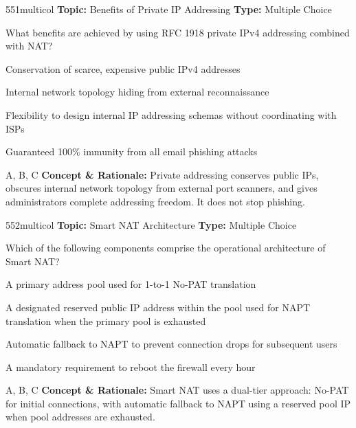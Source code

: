 \begin{qcard}{551}{multicol}
\textcolor{darkslate!75}{\small\textbf{Topic:} Benefits of Private IP Addressing \hfill \textbf{Type:} Multiple Choice}\vspace{0.4em}\par
What benefits are achieved by using RFC 1918 private IPv4 addressing combined with NAT?
\begin{qoptions}
\item Conservation of scarce, expensive public IPv4 addresses
\item Internal network topology hiding from external reconnaissance
\item Flexibility to design internal IP addressing schemas without coordinating with ISPs
\item Guaranteed 100\% immunity from all email phishing attacks
\end{qoptions}
\end{qcard}
\nopagebreak
\begin{explainbox}{A, B, C}
\textbf{Concept \& Rationale:} Private addressing conserves public IPs, obscures internal network topology from external port scanners, and gives administrators complete addressing freedom. It does not stop phishing.
\end{explainbox}

\begin{qcard}{552}{multicol}
\textcolor{darkslate!75}{\small\textbf{Topic:} Smart NAT Architecture \hfill \textbf{Type:} Multiple Choice}\vspace{0.4em}\par
Which of the following components comprise the operational architecture of Smart NAT?
\begin{qoptions}
\item A primary address pool used for 1-to-1 No-PAT translation
\item A designated reserved public IP address within the pool used for NAPT translation when the primary pool is exhausted
\item Automatic fallback to NAPT to prevent connection drops for subsequent users
\item A mandatory requirement to reboot the firewall every hour
\end{qoptions}
\end{qcard}
\nopagebreak
\begin{explainbox}{A, B, C}
\textbf{Concept \& Rationale:} Smart NAT uses a dual-tier approach: No-PAT for initial connections, with automatic fallback to NAPT using a reserved pool IP when pool addresses are exhausted.
\end{explainbox}

